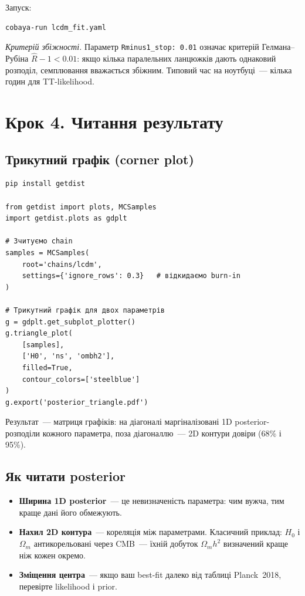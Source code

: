 Запуск:
\begin{verbatim}
cobaya-run lcdm_fit.yaml
\end{verbatim}

\noindent
\textit{Критерій збіжності.} Параметр \texttt{Rminus1\_stop: 0.01}
означає критерій Гелмана--Рубіна $\hat{R} - 1 < 0.01$: якщо
кілька паралельних ланцюжків дають однаковий розподіл,
семплювання вважається збіжним. Типовий час на ноутбуці~---
кілька годин для TT-likelihood.

\section{Крок 4. Читання результату}

\subsection{Трикутний графік (corner plot)}

\begin{verbatim}
pip install getdist

from getdist import plots, MCSamples
import getdist.plots as gdplt

# Зчитуємо chain
samples = MCSamples(
    root='chains/lcdm',
    settings={'ignore_rows': 0.3}   # відкидаємо burn-in
)

# Трикутний графік для двох параметрів
g = gdplt.get_subplot_plotter()
g.triangle_plot(
    [samples],
    ['H0', 'ns', 'ombh2'],
    filled=True,
    contour_colors=['steelblue']
)
g.export('posterior_triangle.pdf')
\end{verbatim}

Результат~--- матриця графіків: на діагоналі маргіналізовані
1D posterior-розподіли кожного параметра, поза діагоналлю~---
2D контури довіри (68\% і 95\%).

\subsection{Як читати posterior}

\begin{itemize}
  \item \textbf{Ширина 1D posterior}~--- це невизначеність
        параметра: чим вужча, тим краще дані його обмежують.
  \item \textbf{Нахил 2D контура}~--- кореляція між параметрами.
        Класичний приклад: $H_0$ і $\Omega_m$ антикорельовані
        через CMB~--- їхній добуток $\Omega_m h^2$ визначений
        краще ніж кожен окремо.
  \item \textbf{Зміщення центра}~--- якщо ваш best-fit далеко
        від таблиці Planck~2018, перевірте likelihood і prior.
\end{itemize}

